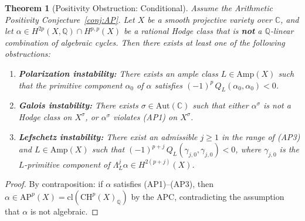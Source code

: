 \documentclass[aps,prd,twocolumn,superscriptaddress,nofootinbib]{revtex4-2}
\newtheorem{theorem}{Theorem}[section]
\theoremstyle{definition}
\theoremstyle{remark}
\begin{document}
\begin{theorem}[Positivity Obstruction: Conditional]
\label{thm:nogo}
Assume the Arithmetic Positivity Conjecture~\ref{conj:AP}. Let $X$ be a smooth projective variety over $\mathbb{C}$, and let $\alpha \in H^{2p}(X, \mathbb{Q}) \cap H^{p,p}(X)$ be a rational Hodge class that is \textbf{not} a $\mathbb{Q}$-linear combination of algebraic cycles. Then there exists at least one of the following obstructions:

\begin{enumerate}
\item[\textbf{(O1)}] \textbf{Polarization instability:} There exists an ample class $L \in \mathrm{Amp}(X)$ such that the primitive component $\alpha_0$ of $\alpha$ satisfies $(-1)^p\,Q_L(\alpha_0, \alpha_0) < 0$.

\item[\textbf{(O2)}] \textbf{Galois instability:} There exists $\sigma \in \mathrm{Aut}(\mathbb{C})$ such that either $\alpha^\sigma$ is not a Hodge class on $X^\sigma$, or $\alpha^\sigma$ violates (AP1) on $X^\sigma$.

\item[\textbf{(O3)}] \textbf{Lefschetz instability:} There exist an admissible $j \geq 1$ in the range of (AP3) and $L \in \mathrm{Amp}(X)$ such that $(-1)^{p+j}\,Q_L(\gamma_{j,0}, \gamma_{j,0}) < 0$, where $\gamma_{j,0}$ is the $L$-primitive component of $\Lambda_L^j \alpha \in H^{2(p+j)}(X)$.
\end{enumerate}
\end{theorem}

\begin{proof}
By contraposition: if $\alpha$ satisfies (AP1)--(AP3), then $\alpha \in \mathrm{AP}^p(X) = \mathrm{cl}(\mathrm{CH}^p(X)_\mathbb{Q})$ by the APC, contradicting the assumption that $\alpha$ is not algebraic.
\end{proof}
\end{document}
